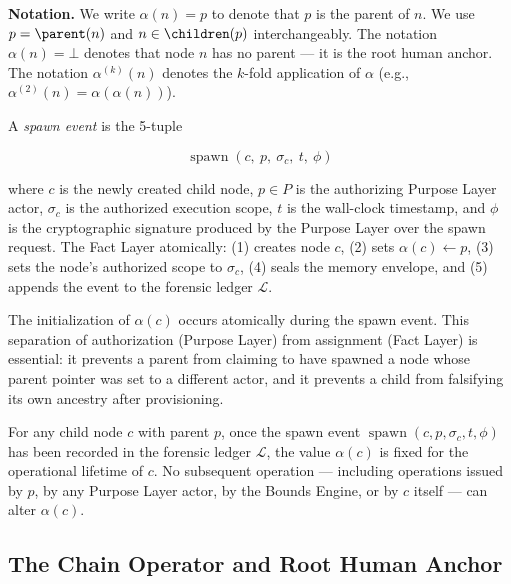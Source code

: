 \bigskip
\noindent\textbf{Notation.} We write $\alpha(n) = p$ to denote that $p$ is the parent of $n$. We use $p = \parent(n)$ and $n \in \children(p)$ interchangeably. The notation $\alpha(n) = \bot$ denotes that node $n$ has no parent --- it is the root human anchor. The notation $\alpha^{(k)}(n)$ denotes the $k$-fold application of $\alpha$ (e.g., $\alpha^{(2)}(n) = \alpha(\alpha(n))$).

\begin{dfn}
\label{dfn:spawn-event}
A \emph{spawn event} is the 5-tuple

\begin{equation}
\operatorname{spawn}(c,\ p,\ \sigma_c,\ t,\ \phi)
\label{eq:spawn-event}
\end{equation}

where $c$ is the newly created child node, $p \in P$ is the authorizing Purpose Layer actor, $\sigma_c$ is the authorized execution scope, $t$ is the wall-clock timestamp, and $\phi$ is the cryptographic signature produced by the Purpose Layer over the spawn request. The Fact Layer atomically: (1) creates node $c$, (2) sets $\alpha(c) \leftarrow p$, (3) sets the node's authorized scope to $\sigma_c$, (4) seals the memory envelope, and (5) appends the event to the forensic ledger $\mathcal{L}$.
\end{dfn}

The initialization of $\alpha(c)$ occurs atomically during the spawn event. This separation of authorization (Purpose Layer) from assignment (Fact Layer) is essential: it prevents a parent from claiming to have spawned a node whose parent pointer was set to a different actor, and it prevents a child from falsifying its own ancestry after provisioning.

\begin{prop}
\label{prop:parent-pointer-immutable}
For any child node $c$ with parent $p$, once the spawn event $\operatorname{spawn}(c, p, \sigma_c, t, \phi)$ has been recorded in the forensic ledger $\mathcal{L}$, the value $\alpha(c)$ is fixed for the operational lifetime of $c$. No subsequent operation --- including operations issued by $p$, by any Purpose Layer actor, by the Bounds Engine, or by $c$ itself --- can alter $\alpha(c)$.
\end{prop}

\subsection{The Chain Operator and Root Human Anchor}
\label{sec:chain-operator}

